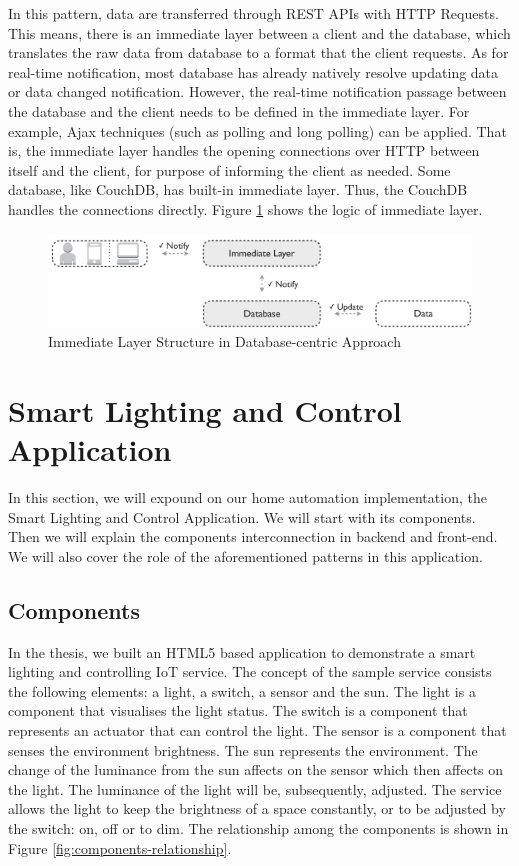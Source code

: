 In this pattern, data are transferred through REST APIs with HTTP Requests. This means, there is an immediate layer between a client and the database, which translates the raw data from database to a format that the client requests. As for real-time notification, most database has already natively resolve updating data or data changed notification. However, the real-time notification passage between the database and the client needs to be defined in the immediate layer. For example, Ajax techniques (such as polling and long polling) can be applied. That is, the immediate layer handles the opening connections over HTTP between itself and the client, for purpose of informing the client as needed. Some database, like CouchDB, has built-in immediate layer. Thus, the CouchDB handles the connections directly. Figure \ref{fig:immediate-layer} shows the logic of immediate layer.

\begin{figure}[ht]
  \begin{center}
    \includegraphics[width=1\textwidth]{images/immediate-layer.pdf}
    \caption{Immediate Layer Structure in Database-centric Approach}
    \label{fig:immediate-layer}
  \end{center}
\end{figure}

\section{Smart Lighting and Control Application}

In this section, we will expound on our home automation implementation, the Smart Lighting and Control Application. We will start with its components. Then we will explain the components interconnection in backend and front-end. We will also cover the role of the aforementioned patterns in this application.

\subsection{Components}
In the thesis, we built an HTML5 based application to demonstrate a smart lighting and controlling IoT service. The concept of the sample service consists the following elements: a light, a switch, a sensor and the sun. The light is a component that visualises the light status. The switch is a component that represents an actuator that can control the light. The sensor is a component that senses the environment brightness. The sun represents the environment. The change of the luminance from the sun affects on the sensor which then affects on the light. The luminance of the light will be, subsequently, adjusted. The service allows the light to keep the brightness of a space constantly, or to be adjusted by the switch: on, off or to dim. The relationship among the components is shown in Figure \ref{fig:components-relationship}. 

